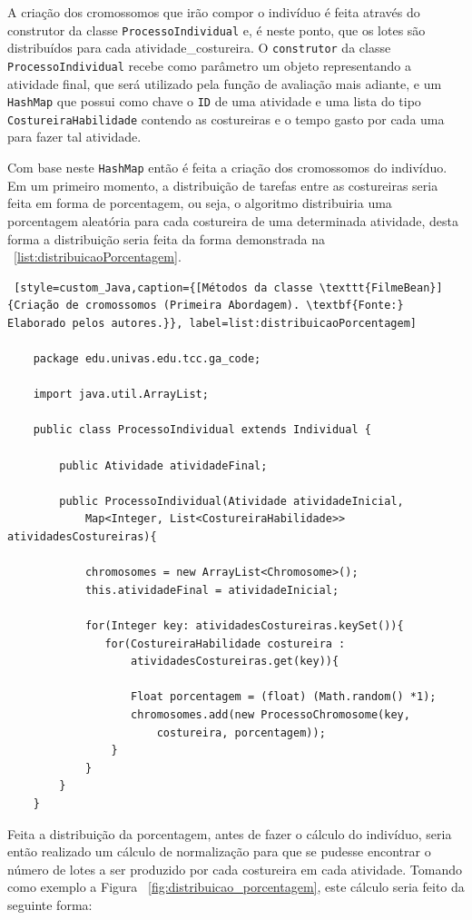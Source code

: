 \par A criação dos cromossomos que irão compor o indivíduo é feita através do construtor da classe 
\texttt{ProcessoIndividual} e, é neste ponto, que os lotes são distribuídos para
cada atividade\_costureira.
O \texttt{construtor} da classe \texttt{ProcessoIndividual} recebe como
parâmetro um objeto representando a atividade final, que será utilizado pela função de avaliação mais adiante, e um \texttt{HashMap} que possui como chave o
\texttt{ID} de uma atividade e uma lista do  tipo \texttt{CostureiraHabilidade} contendo as costureiras e o tempo 
gasto por cada uma para fazer tal atividade.

\par Com base neste \texttt{HashMap} então é feita a criação dos cromossomos do indivíduo.
Em um primeiro momento, a distribuição de tarefas entre as costureiras seria feita em forma 
de porcentagem, ou seja, o algoritmo distribuiria uma porcentagem aleatória para cada costureira de 
uma determinada atividade, desta forma a distribuição seria feita da forma
demonstrada na ~\ref{list:distribuicaoPorcentagem}.

\begin{lstlisting} [style=custom_Java,caption={[Métodos da classe \texttt{FilmeBean}]{Criação de cromossomos (Primeira Abordagem). \textbf{Fonte:} Elaborado pelos autores.}}, label=list:distribuicaoPorcentagem] 	

	package edu.univas.edu.tcc.ga_code;
	
	import java.util.ArrayList;
	
	public class ProcessoIndividual extends Individual {
		
		public Atividade atividadeFinal;
		
		public ProcessoIndividual(Atividade atividadeInicial,
			Map<Integer, List<CostureiraHabilidade>> atividadesCostureiras){
		
			chromosomes = new ArrayList<Chromosome>();
			this.atividadeFinal = atividadeInicial;
			
			for(Integer key: atividadesCostureiras.keySet()){
			   for(CostureiraHabilidade costureira : 
				   atividadesCostureiras.get(key)){
				
				   Float porcentagem = (float) (Math.random() *1);
				   chromosomes.add(new ProcessoChromosome(key, 
					   costureira, porcentagem));
				}
			}
		}
	}

\end{lstlisting}
 
\par Feita a distribuição da porcentagem, antes de fazer o cálculo do indivíduo, seria então realizado 
um cálculo de normalização para que se pudesse encontrar o número de lotes a ser
produzido por cada costureira em cada atividade. Tomando como exemplo a Figura
~\ref{fig:distribuicao_porcentagem}, este cálculo seria feito da seguinte forma:

